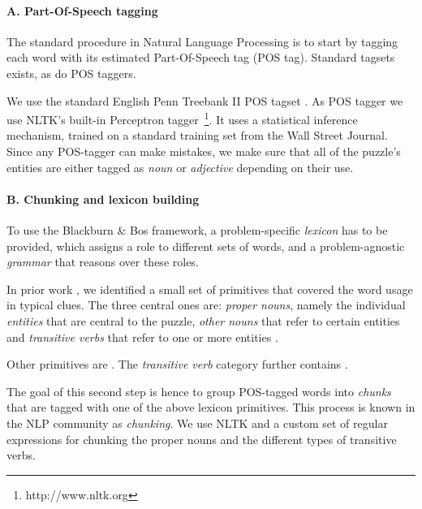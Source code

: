 \paragraph{A. Part-Of-Speech tagging}
The standard procedure in Natural Language Processing is to start by tagging each word with its estimated Part-Of-Speech tag (POS tag). Standard tagsets exists, as do POS taggers.

We use the standard English Penn Treebank II POS tagset \cite{DBLP:journals/coling/MarcusSM94}. As POS tagger we use NLTK's built-in Perceptron tagger~\footnote{http://www.nltk.org}. It uses a statistical inference mechanism, trained on a standard training set from the Wall Street Journal. 
Since any POS-tagger can make mistakes, we make sure that all of the puzzle's entities are either tagged as \textit{noun} or \textit{adjective} depending on their use.

\paragraph{B. Chunking and lexicon building}
To use the Blackburn \& Bos framework, a problem-specific \textit{lexicon} has to be provided, which assigns a role to different sets of words, and a problem-agnostic \textit{grammar} that reasons over these roles.

In prior work \cite{msc/Claes17}, we identified a small set of primitives that covered the word usage in typical clues. The three central ones are: \textit{proper nouns}, namely the individual \textit{entities} that are central to the puzzle, \textit{other nouns}  that refer to certain entities and \textit{transitive verbs} that refer to one or more entities .

Other primitives are . The \textit{transitive verb} category further contains .

The goal of this second step is hence to group POS-tagged words into \textit{chunks} that are tagged with one of the above lexicon primitives. This process is known in the NLP community as \textit{chunking}. We use NLTK and a custom set of regular expressions for chunking the proper nouns and the different types of transitive verbs. 


